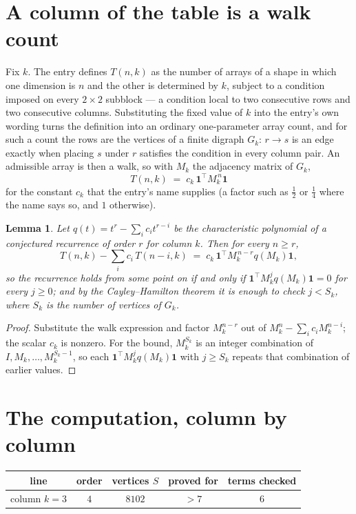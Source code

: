 \documentclass[11pt,a4paper]{article}
\theoremstyle{plain}
\newtheorem{lemma}[theorem]{Lemma}
\theoremstyle{definition}
\begin{document}
\section{A column of the table is a walk count}

Fix $k$. The entry defines $T(n,k)$ as the number of arrays of a shape in which one dimension
is $n$ and the other is determined by $k$, subject to a condition imposed on every
$2\times2$ subblock --- a condition local to two consecutive rows and two consecutive columns.
Substituting the fixed value of $k$ into the entry's own wording turns the definition into an
ordinary one-parameter array count, and for such a count the rows are the vertices of a finite
digraph $G_k$: $r\to s$ is an edge exactly when placing $s$ under $r$ satisfies the condition
in every column pair. An admissible array is then a walk, so with $M_k$ the adjacency matrix
of $G_k$,
\[
T(n,k)\;=\;c_k\,\mathbf{1}^{\!\top}M_k^{\,n}\mathbf{1}
\]
for the constant $c_k$ that the entry's name supplies (a factor such as $\tfrac12$ or
$\tfrac14$ where the name says so, and $1$ otherwise).

\begin{lemma}\label{lem:crit}
Let $q(t)=t^{r}-\sum_i c_it^{r-i}$ be the characteristic polynomial of a conjectured
recurrence of order $r$ for column $k$. Then for every $n\ge r$,
\[
T(n,k)-\sum_i c_i\,T(n-i,k)\;=\;c_k\,\mathbf{1}^{\!\top}M_k^{\,n-r}q(M_k)\mathbf{1},
\]
so the recurrence holds from some point on if and only if
$\mathbf{1}^{\!\top}M_k^{j}q(M_k)\mathbf{1}=0$ for every $j\ge0$; and by the
Cayley--Hamilton theorem it is enough to check $j<S_k$, where $S_k$ is the number of vertices
of $G_k$.
\end{lemma}

\begin{proof}
Substitute the walk expression and factor $M_k^{n-r}$ out of $M_k^{n}-\sum_ic_iM_k^{n-i}$;
the scalar $c_k$ is nonzero. For the bound, $M_k^{S_k}$ is an integer combination of
$I,M_k,\dots,M_k^{S_k-1}$, so each $\mathbf{1}^{\!\top}M_k^{j}q(M_k)\mathbf{1}$ with
$j\ge S_k$ repeats that combination of earlier values.
\end{proof}

\section{The computation, column by column}

\begin{center}
\begin{tabular}{ccccc}
line & order & vertices $S$ & proved for & terms checked \\ \hline
column $k$$=3$ & $4$ & $8102$ & $>7$ & $6$ \\
\end{tabular}
\end{center}
\end{document}
